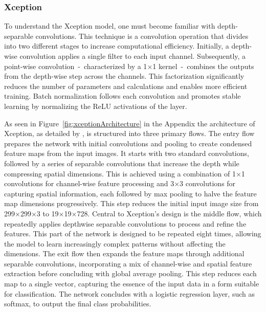 \subsubsection{Xception}\label{xception}

To understand the Xception model, one must become familiar with depth-separable convolutions. This technique is a convolution operation that divides into two different stages to increase computational efficiency. Initially, a depth-wise convolution applies a single filter to each input channel. Subsequently, a point-wise convolution~-~characterized by a 1$\times$1 kernel~-~combines the outputs from the depth-wise step across the channels. This factorization significantly reduces the number of parameters and calculations and enables more efficient training. Batch normalization follows each convolution and promotes stable learning by normalizing the ReLU activations of the layer.

As seen in Figure~\ref{fig:xceptionArchitecture} in the Appendix the architecture of Xception, as detailed by \citep{chollet2017xception}, is structured into three primary flows. The entry flow prepares the network with initial convolutions and pooling to create condensed feature maps from the input images. It starts with two standard convolutions, followed by a series of separable convolutions that increase the depth while compressing spatial dimensions. This is achieved using a combination of 1$\times$1 convolutions for channel-wise feature processing and 3$\times$3 convolutions for capturing spatial information, each followed by max pooling to halve the feature map dimensions progressively. This step reduces the initial input image size from 299$\times$299$\times$3 to 19$\times$19$\times$728. Central to Xception's design is the middle flow, which repeatedly applies depthwise separable convolutions to process and refine the features. This part of the network is designed to be repeated eight times, allowing the model to learn increasingly complex patterns without affecting the dimensions. The exit flow then expands the feature maps through additional separable convolutions, incorporating a mix of channel-wise and spatial feature extraction before concluding with global average pooling. This step reduces each map to a single vector, capturing the essence of the input data in a form suitable for classification. The network concludes with a logistic regression layer, such as softmax, to output the final class probabilities.